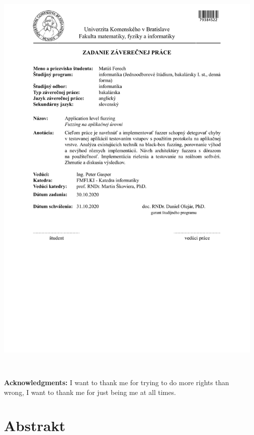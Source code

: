 \documentclass[12pt, twoside]{book}
\begin{document}
\hspace{-2cm}\includegraphics[width=1.1\textwidth]{images/assignment-sk}


\frontmatter

\setcounter{page}{3}
\newpage
~

\vfill
{\bf Acknowledgments:} I want to thank me for trying to do more rights than
wrong, I want to thank me for just being me at all times.


\newpage
\section*{Abstrakt}
\end{document}
